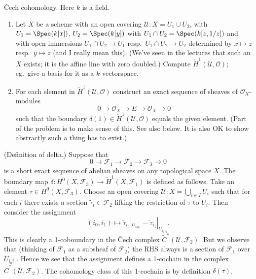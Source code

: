 \begin{exercise}
\label{exercise-cech-cohomology}
{\v C}ech cohomology. Here $k$ is a field.
\begin{enumerate}
\item Let $X$ be a scheme with an open covering
${\mathcal U} : X = U_1 \cup U_2$, with $U_1 = \Spec(k[x])$,
$U_2 =  \Spec(k[y])$
with $U_1 \cap U_2 = \Spec(k[z, 1/z])$ and with open immersions
$U_1 \cap U_2 \to U_1$ resp.\ $U_1 \cap U_2 \to U_2$ determined
by $x \mapsto z$ resp.\ $y \mapsto z$ (and I really mean this).
(We've seen in the lectures that such an $X$ exists; it is the affine
line with zero doubled.) Compute ${\check H}^1({\mathcal U}, {\mathcal
O})$;
eg.\ give a basis for it as a $k$-vectorspace.
\item For each element in
${\check H}^1({\mathcal U}, {\mathcal O})$
construct an exact sequence of sheaves of ${\mathcal O}_X$-modules
$$
0 \to {\mathcal O}_X \to E \to {\mathcal O}_X \to 0
$$
such that the boundary $\delta(1) \in {\check H}^1({\mathcal U},
{\mathcal O})$
equals the given element. (Part of the problem is to make sense of this.
See also below.
It is also OK to show abstractly such a thing has to exist.)
\end{enumerate}
\end{exercise}

\begin{definition}
\label{definition-delta}
(Definition of delta.) Suppose that
$$
0 \to {\mathcal F}_1 \to {\mathcal F}_2 \to {\mathcal F}_3 \to 0
$$
is a short exact sequence of abelian sheaves on any topological space $X$.
The boundary map
$\delta : H^0(X, {\mathcal F}_3) \to {\check H}^1(X, {\mathcal F}_1)$
is defined as follows. Take an element $\tau \in H^0(X, {\mathcal F}_3)$.
Choose an open covering ${\mathcal U} : X = \bigcup_{i\in I} U_i$ such
that for each $i$ there exists a section $\tilde \tau_i \in {\mathcal F}_2$
lifting the restriction of $\tau$ to $U_i$. Then consider the assignment
$$
(i_0, i_1) \longmapsto
\tilde \tau_{i_0}|_{U_{i_0i_1}} - \tilde \tau_{i_1}|_{U_{i_0i_1}}.
$$
This is clearly a 1-coboundary in the {\v C}ech complex
${\check C}^\ast({\mathcal U}, {\mathcal F}_2)$. But we observe that
(thinking of ${\mathcal F}_1$ as a subsheaf of ${\mathcal F}_2$) the RHS
always is a section of ${\mathcal F}_1$ over $U_{i_0i_1}$. Hence we
see that the assignment defines a 1-cochain in the complex
${\check C}^\ast({\mathcal U}, {\mathcal F}_2)$. The cohomology
class of this 1-cochain is by definition {\it $\delta(\tau)$}.
\end{definition}



